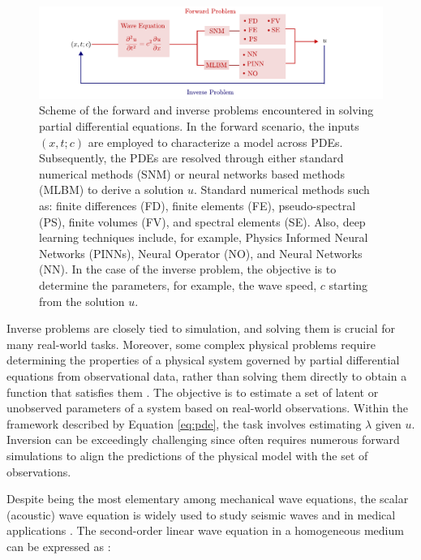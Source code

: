 \documentclass[11pt,twoside]{article}
\begin{document}
\begin{figure}[h]
\includegraphics{figs/forward_inverse_modeling_waves.pdf}
    \caption{Scheme of the forward and inverse problems encountered in solving partial differential equations. In the forward 
    scenario, the inputs $(x,t;c)$ are employed to characterize a model across PDEs. Subsequently, the PDEs are resolved through 
    either standard numerical methods (SNM) or neural networks based methods (MLBM) to derive a solution $u$. Standard numerical 
    methods such as: finite differences (FD), finite elements (FE), pseudo-spectral (PS), finite volumes (FV), and spectral 
    elements (SE). Also, deep learning techniques include, for example, Physics Informed Neural Networks (PINNs), Neural Operator 
    (NO), and Neural Networks (NN). In the case of the inverse problem, the objective is to determine the parameters, for example, 
    the wave speed, $c$ starting from the solution $u$.}
    \label{fig:forward_inverse}
\end{figure}

Inverse problems are closely tied to simulation, and solving them is crucial for many real-world tasks. Moreover, some complex 
physical problems require determining the properties of a physical system governed by partial differential equations from 
observational data, rather than solving them directly to obtain a function that satisfies them 
\citep{galiounas_battery_2022, ren_seismicnet_2024,mccann_convolutional_2017}. The objective is to estimate a set of latent or 
unobserved parameters of a system based on real-world observations. Within the framework described by Equation \ref{eq:pde}, 
the task involves estimating $\lambda$ given $u$. Inversion can be exceedingly challenging since often requires numerous forward 
simulations to align the predictions of the physical model with the set of observations. 

Despite being the most elementary among mechanical wave equations, the scalar (acoustic) wave equation is widely used to study 
seismic waves and in medical applications \citep{moseley_physics-informed_2022, alkhadhr_wave_2023}. The second-order linear 
wave equation in a homogeneous medium can be expressed as \citep{Carcione2002}:
\end{document}
